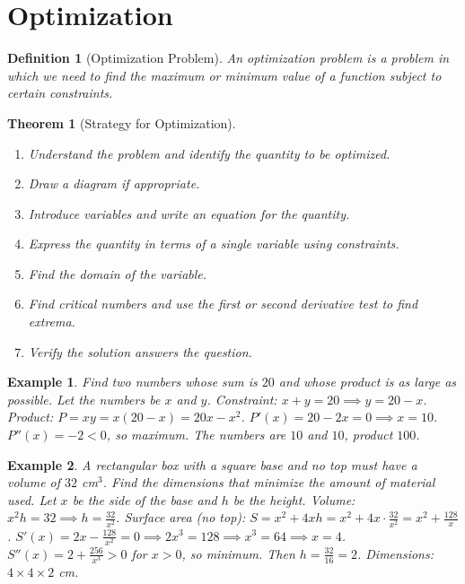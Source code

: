 \documentclass[11pt,a4paper]{article}
\newtheorem{example}{Example}
\newtheorem{theorem}{Theorem}
\newtheorem{definition}{Definition}
\begin{document}
\section{Optimization}
\begin{definition}[Optimization Problem]
An \textit{optimization problem} is a problem in which we need to find the maximum or minimum value of a function subject to certain constraints.
\end{definition}
\begin{theorem}[Strategy for Optimization]
\begin{enumerate}
\item Understand the problem and identify the quantity to be optimized.
\item Draw a diagram if appropriate.
\item Introduce variables and write an equation for the quantity.
\item Express the quantity in terms of a single variable using constraints.
\item Find the domain of the variable.
\item Find critical numbers and use the first or second derivative test to find extrema.
\item Verify the solution answers the question.
\end{enumerate}
\end{theorem}
\begin{example}
Find two numbers whose sum is $20$ and whose product is as large as possible.
Let the numbers be $x$ and $y$. Constraint: $x + y = 20 \implies y = 20 - x$.
Product: $P = x y = x(20 - x) = 20x - x^2$.
$P'(x) = 20 - 2x = 0 \implies x = 10$. $P''(x) = -2 < 0$, so maximum.
The numbers are $10$ and $10$, product $100$.
\end{example}
\begin{example}
A rectangular box with a square base and no top must have a volume of $32$ cm$^3$. Find the dimensions that minimize the amount of material used.
Let $x$ be the side of the base and $h$ be the height. Volume: $x^2 h = 32 \implies h = \frac{32}{x^2}$.
Surface area (no top): $S = x^2 + 4xh = x^2 + 4x \cdot \frac{32}{x^2} = x^2 + \frac{128}{x}$.
$S'(x) = 2x - \frac{128}{x^2} = 0 \implies 2x^3 = 128 \implies x^3 = 64 \implies x = 4$.
$S''(x) = 2 + \frac{256}{x^3} > 0$ for $x > 0$, so minimum.
Then $h = \frac{32}{16} = 2$. Dimensions: $4 \times 4 \times 2$ cm.
\end{example}
\end{document}

